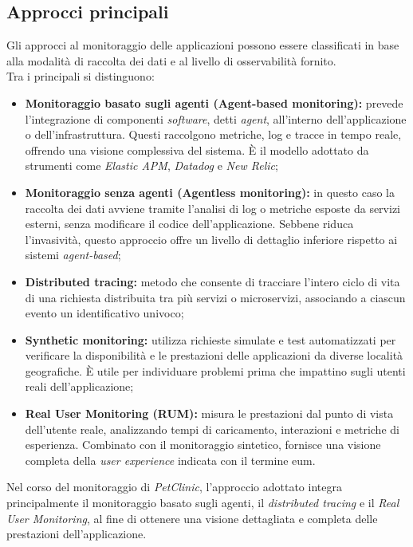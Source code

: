 \subsection{Approcci principali}
Gli approcci al monitoraggio delle applicazioni possono essere classificati in base alla modalità di raccolta dei dati e al livello di osservabilità fornito. \\
Tra i principali si distinguono:
\begin{itemize}
\item \textbf{Monitoraggio basato sugli agenti (Agent-based monitoring):} prevede l'integrazione di componenti \emph{software}, detti \emph{agent}, all'interno dell'applicazione o dell'infrastruttura. Questi raccolgono metriche, log e tracce in tempo reale, offrendo una visione complessiva del sistema. È il modello adottato da strumenti come \emph{Elastic APM}, \emph{Datadog} e \emph{New Relic};

\item \textbf{Monitoraggio senza agenti (Agentless monitoring):} in questo caso la raccolta dei dati avviene tramite l'analisi di log o metriche esposte da servizi esterni, senza modificare il codice dell'applicazione. Sebbene riduca l'invasività, questo approccio offre un livello di dettaglio inferiore rispetto ai sistemi \emph{agent-based};

\item \textbf{Distributed tracing:} metodo che consente di tracciare l'intero ciclo di vita di una richiesta distribuita tra più servizi o microservizi, associando a ciascun evento un identificativo univoco;

\item \textbf{Synthetic monitoring:} utilizza richieste simulate e test automatizzati per verificare la disponibilità e le prestazioni delle applicazioni da diverse località geografiche. È utile per individuare problemi prima che impattino sugli utenti reali dell'applicazione;

\item \textbf{Real User Monitoring (RUM):} misura le prestazioni dal punto di vista dell'utente reale, analizzando tempi di caricamento, interazioni e metriche di esperienza. Combinato con il monitoraggio sintetico, fornisce una visione completa della \emph{user experience} indicata con il termine \gls{eum}\glsfirstoccur.
\end{itemize}
Nel corso del monitoraggio di \emph{PetClinic}, l'approccio adottato integra principalmente il monitoraggio basato sugli agenti, il \emph{distributed tracing} e il \emph{Real User Monitoring}, al fine di ottenere una visione dettagliata e completa delle prestazioni dell'applicazione.


